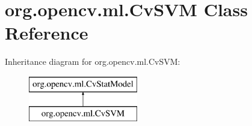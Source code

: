 \hypertarget{classorg_1_1opencv_1_1ml_1_1_cv_s_v_m}{}\section{org.\+opencv.\+ml.\+Cv\+S\+VM Class Reference}
\label{classorg_1_1opencv_1_1ml_1_1_cv_s_v_m}
Inheritance diagram for org.\+opencv.\+ml.\+Cv\+S\+VM\+:\begin{figure}[H]
\begin{center}
\leavevmode
\includegraphics[height=2.000000cm]{classorg_1_1opencv_1_1ml_1_1_cv_s_v_m}
\end{center}
\end{figure}
